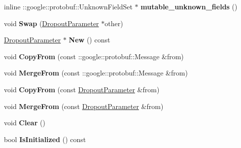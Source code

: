 \begin{DoxyCompactItemize}
inline \+::google\+::protobuf\+::\+Unknown\+Field\+Set $\ast$ {\bfseries mutable\+\_\+unknown\+\_\+fields} ()
\item 
\mbox{\label{classcaffe_1_1_dropout_parameter_ad3dbe037e2cb5ef4165c44c2600cba0d}} 
void {\bfseries Swap} (\mbox{\hyperlink{classcaffe_1_1_dropout_parameter}{Dropout\+Parameter}} $\ast$other)
\item 
\mbox{\label{classcaffe_1_1_dropout_parameter_a2afbc62ea9298a5febb3705e9fb27e84}} 
\mbox{\hyperlink{classcaffe_1_1_dropout_parameter}{Dropout\+Parameter}} $\ast$ {\bfseries New} () const
\item 
\mbox{\label{classcaffe_1_1_dropout_parameter_a2d87399618bd627a1b9045b04d1b0e1a}} 
void {\bfseries Copy\+From} (const \+::google\+::protobuf\+::\+Message \&from)
\item 
\mbox{\label{classcaffe_1_1_dropout_parameter_ab7f3fca21c095254755e81d544fde70c}} 
void {\bfseries Merge\+From} (const \+::google\+::protobuf\+::\+Message \&from)
\item 
\mbox{\label{classcaffe_1_1_dropout_parameter_ab1140711b3dff23d107b70f4c302fa18}} 
void {\bfseries Copy\+From} (const \mbox{\hyperlink{classcaffe_1_1_dropout_parameter}{Dropout\+Parameter}} \&from)
\item 
\mbox{\label{classcaffe_1_1_dropout_parameter_a9b1ed23462149b60e54d53fb2c14120b}} 
void {\bfseries Merge\+From} (const \mbox{\hyperlink{classcaffe_1_1_dropout_parameter}{Dropout\+Parameter}} \&from)
\item 
\mbox{\label{classcaffe_1_1_dropout_parameter_a5ceb8c4f3b1be5739621749b628bc886}} 
void {\bfseries Clear} ()
\item 
\mbox{\label{classcaffe_1_1_dropout_parameter_ad0028258058917fbb7e75bdd54e1044c}} 
bool {\bfseries Is\+Initialized} () const
\item 
\mbox{\label{classcaffe_1_1_dropout_parameter_a4763ffb1e7c060a147efe29aa695af60}} 

\end{DoxyCompactItemize}
